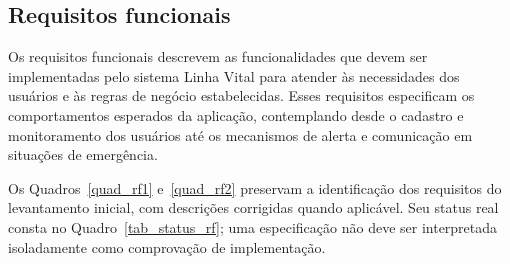 \subsection{Requisitos funcionais}

Os requisitos funcionais descrevem as funcionalidades que devem ser implementadas pelo sistema Linha Vital para atender às necessidades dos usuários e às regras de negócio estabelecidas. Esses requisitos especificam os comportamentos esperados da aplicação, contemplando desde o cadastro e monitoramento dos usuários até os mecanismos de alerta e comunicação em situações de emergência.

Os Quadros~\ref{quad_rf1} e~\ref{quad_rf2} preservam a identificação dos requisitos do levantamento inicial, com descrições corrigidas quando aplicável. Seu status real consta no Quadro~\ref{tab_status_rf}; uma especificação não deve ser interpretada isoladamente como comprovação de implementação.

